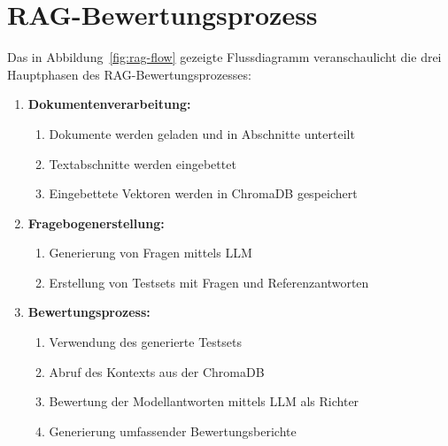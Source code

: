 \section{RAG-Bewertungsprozess}

Das in Abbildung~\ref{fig:rag-flow} gezeigte Flussdiagramm veranschaulicht die drei Hauptphasen des RAG-Bewertungsprozesses:

\begin{enumerate}
    \item \textbf{Dokumentenverarbeitung:}
    \begin{enumerate}
        \item Dokumente werden geladen und in Abschnitte unterteilt
        \item Textabschnitte werden eingebettet
        \item Eingebettete Vektoren werden in ChromaDB gespeichert
    \end{enumerate}
    
    \item \textbf{Fragebogenerstellung:}
    \begin{enumerate}
        \item Generierung von Fragen mittels LLM
        \item Erstellung von Testsets mit Fragen und Referenzantworten
    \end{enumerate}
    
    \item \textbf{Bewertungsprozess:}
    \begin{enumerate}
        \item Verwendung des generierte Testsets
        \item Abruf des Kontexts aus der ChromaDB
        \item Bewertung der Modellantworten mittels LLM als Richter
        \item Generierung umfassender Bewertungsberichte
    \end{enumerate}
\end{enumerate}


